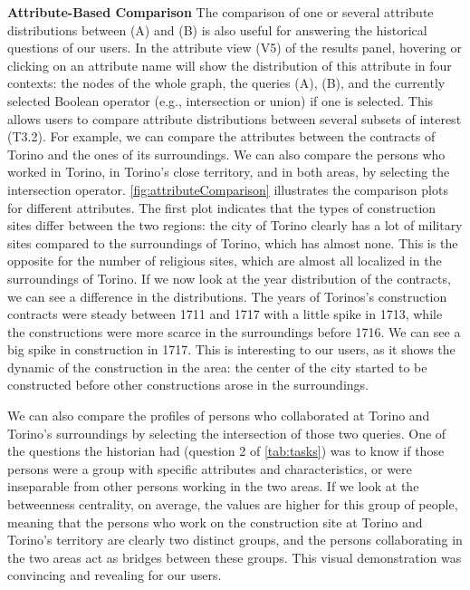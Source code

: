 \noindent\textbf{Attribute-Based Comparison}
The comparison of one or several attribute distributions between (A) and (B) is also useful for answering the historical questions of our users.
In the attribute view (V5) of the results panel, hovering or clicking on an attribute name will show the distribution of this attribute in four contexts: the nodes of the whole graph, the queries (A), (B), and the currently selected Boolean operator (e.g., intersection or union) if one is selected.
This allows users to compare attribute distributions between several subsets of interest (T3.2).
For example, we can compare the attributes between the contracts of Torino and the ones of its surroundings.
We can also compare the persons who worked in Torino, in Torino's close territory, and in both areas, by selecting the intersection operator.
\autoref{fig:attributeComparison} illustrates the comparison plots for different attributes.
The first plot indicates that the types of construction sites differ between the two regions: the city of Torino clearly has a lot of military sites compared to the surroundings of Torino, which has almost none.
This is the opposite for the number of religious sites, which are almost all localized in the surroundings of Torino.
If we now look at the year distribution of the contracts, we can see a difference in the distributions.
The years of Torinos's construction contracts were steady between 1711 and 1717 with a little spike in 1713, while the constructions were more scarce in the surroundings before 1716.
We can see a big spike in construction in 1717.
This is interesting to our users, as it shows the dynamic of the construction in the area: the center of the city started to be constructed before other constructions arose in the surroundings.

We can also compare the profiles of persons who collaborated at Torino and Torino's surroundings by selecting the intersection of those two queries.
One of the questions the historian had (question 2 of \autoref{tab:tasks}) was to know if those persons were a group with specific attributes and characteristics, or were inseparable from other persons working in the two areas.
If we look at the betweenness centrality, on average, the values are higher for this group of people, meaning that the persons who work on the construction site at Torino and Torino's territory are clearly two distinct groups, and the persons collaborating in the two areas act as bridges between these groups.
This visual demonstration was convincing and revealing for our users.

